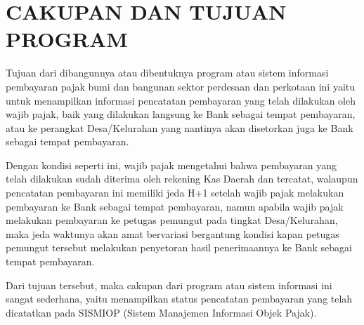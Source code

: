 \chapter{CAKUPAN DAN TUJUAN PROGRAM}

Tujuan dari dibangunnya atau dibentuknya program atau sistem informasi pembayaran pajak bumi dan bangunan sektor perdesaan dan perkotaan ini yaitu untuk menampilkan informasi pencatatan pembayaran yang telah dilakukan oleh wajib pajak, baik yang dilakukan langsung ke Bank sebagai tempat pembayaran, atau ke perangkat Desa/Kelurahan yang nantinya akan disetorkan juga ke Bank sebagai tempat pembayaran.

Dengan kondisi seperti ini, wajib pajak mengetahui bahwa pembayaran yang telah dilakukan sudah diterima oleh rekening Kas Daerah dan tercatat, walaupun pencatatan pembayaran ini memiliki jeda H+1 setelah wajib pajak melakukan pembayaran ke Bank sebagai tempat pembayaran, namun apabila wajib pajak melakukan pembayaran ke petugas pemungut pada tingkat Desa/Kelurahan, maka jeda waktunya akan amat bervariasi bergantung kondisi kapan petugas pemungut tersebut melakukan penyetoran hasil penerimaannya ke Bank sebagai tempat pembayaran.

Dari tujuan tersebut, maka cakupan dari program atau sistem informasi ini sangat sederhana, yaitu menampilkan status pencatatan pembayaran yang telah dicatatkan pada SISMIOP (Sistem Manajemen Informasi Objek Pajak).